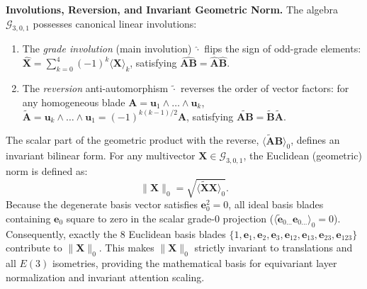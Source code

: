 \documentclass[10pt]{article}
\begin{document}
\noindent\textbf{Involutions, Reversion, and Invariant Geometric Norm.}
The algebra $\mathcal{G}_{3,0,1}$ possesses canonical linear involutions:
\begin{enumerate}
    \item The \emph{grade involution} (main involution) $\widehat{\cdot}$ flips the sign of odd-grade elements: $\widehat{\mathbf{X}} = \sum_{k=0}^4 (-1)^k \langle \mathbf{X} \rangle_k$, satisfying $\widehat{\mathbf{A}\mathbf{B}} = \widehat{\mathbf{A}}\widehat{\mathbf{B}}$.
    \item The \emph{reversion} anti-automorphism $\widetilde{\cdot}$ reverses the order of vector factors: for any homogeneous blade $\mathbf{A} = \mathbf{u}_1 \wedge \dots \wedge \mathbf{u}_k$, $\widetilde{\mathbf{A}} = \mathbf{u}_k \wedge \dots \wedge \mathbf{u}_1 = (-1)^{k(k-1)/2} \mathbf{A}$, satisfying $\widetilde{\mathbf{A}\mathbf{B}} = \widetilde{\mathbf{B}}\widetilde{\mathbf{A}}$.
\end{enumerate}
The scalar part of the geometric product with the reverse, $\langle \widetilde{\mathbf{A}} \mathbf{B} \rangle_0$, defines an invariant bilinear form. For any multivector $\mathbf{X} \in \mathcal{G}_{3,0,1}$, the Euclidean (geometric) norm is defined as:
\begin{equation}
    \|\mathbf{X}\|_0 = \sqrt{\langle \widetilde{\mathbf{X}} \mathbf{X} \rangle_0}.
    \label{eq:pga_norm}
\end{equation}
Because the degenerate basis vector satisfies $\mathbf{e}_0^2 = 0$, all ideal basis blades containing $\mathbf{e}_0$ square to zero in the scalar grade-0 projection ($\langle \widetilde{\mathbf{e}}_{0\dots} \mathbf{e}_{0\dots} \rangle_0 = 0$). Consequently, exactly the 8 Euclidean basis blades $\{1, \mathbf{e}_1, \mathbf{e}_2, \mathbf{e}_3, \mathbf{e}_{12}, \mathbf{e}_{13}, \mathbf{e}_{23}, \mathbf{e}_{123}\}$ contribute to $\|\mathbf{X}\|_0$. This makes $\|\mathbf{X}\|_0$ strictly invariant to translations and all $E(3)$ isometries, providing the mathematical basis for equivariant layer normalization and invariant attention scaling.
\end{document}
